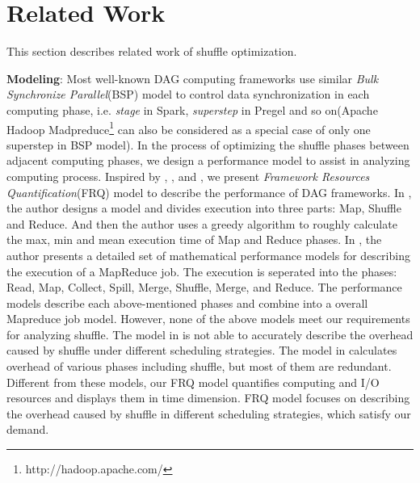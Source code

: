 \section{Related Work}
This section describes related work of shuffle optimization.

{\color{blue}
\textbf{Modeling}: Most well-known DAG computing frameworks use similar \textit{Bulk Synchronize Parallel}(BSP)\cite{valiant1990bridging} model to control data synchronization in each computing phase, i.e. \textit{stage} in Spark, \textit{superstep} in Pregel\cite{malewicz2010pregel} and so on(Apache Hadoop Madpreduce\footnote{http://hadoop.apache.com/} can also be considered as a special case of only one superstep in BSP model). 
In the process of optimizing the shuffle phases between adjacent computing phases, we design a performance model to assist in analyzing computing process.
Inspired by \cite{verma2011aria}, \cite{herodotou2011hadoop}, and \cite{polo2010performance}, we present \textit{Framework Resources Quantification}(FRQ) model to describe the performance of DAG frameworks.
In \cite{verma2011aria}, the author designs a model and divides execution into three parts: Map, Shuffle and Reduce. And then the author uses a greedy algorithm to roughly calculate the max, min and mean execution time of Map and Reduce phases.
In \cite{herodotou2011hadoop}, the author presents a detailed set of mathematical performance models for describing the execution of a MapReduce job. The execution is seperated into the phases: Read, Map, Collect, Spill, Merge, Shuffle, Merge, and Reduce. The performance models describe each above-mentioned phases and combine into a overall Mapreduce job model. 
However, none of the above models meet our requirements for analyzing shuffle.
The model in \cite{verma2011aria} is not able to accurately describe the overhead caused by shuffle under different scheduling strategies. The model in \cite{herodotou2011hadoop} calculates overhead of various phases including shuffle, but most of them are redundant. 
Different from these models, our FRQ model quantifies computing and I/O resources and displays them in time dimension. FRQ model focuses on describing the overhead caused by shuffle in different scheduling strategies, which satisfy our demand.
}

